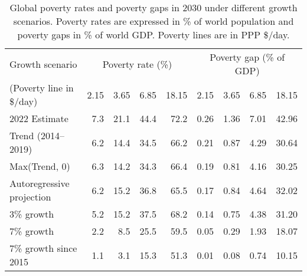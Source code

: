 \begin{table}[h]

\caption[Global poverty (rates and gaps) in 2030 under different growth scenarios.]{\label{tab:poverty}Global poverty rates and poverty gaps in 2030 under different growth scenarios. Poverty rates are expressed in \% of world population and poverty gaps in \% of world GDP. Poverty lines are in PPP \$/day.}
\centering
\begin{tabular}[t]{lrrrrrrrr}
\toprule Growth scenario & \multicolumn{4}{c}{Poverty rate (\%)} & \multicolumn{4}{c}{Poverty gap (\% of GDP)} \\ 
 (Poverty line in \$/day)  & 2.15 & 3.65 & 6.85 & 18.15 & 2.15 & 3.65 & 6.85 & 18.15\\
\midrule
2022 Estimate & 7.3 & 21.1 & 44.4 & 72.2 & 0.26 & 1.36 & 7.01 & 42.96\\
Trend (2014--2019) & 6.2 & 14.4 & 34.5 & 66.2 & 0.21 & 0.87 & 4.29 & 30.64\\
Max(Trend, 0) & 6.3 & 14.2 & 34.3 & 66.4 & 0.19 & 0.81 & 4.16 & 30.25\\
Autoregressive projection & 6.2 & 15.2 & 36.8 & 65.5 & 0.17 & 0.84 & 4.64 & 32.02\\
3\% growth & 5.2 & 15.2 & 37.5 & 68.2 & 0.14 & 0.75 & 4.38 & 31.20\\
7\% growth & 2.2 & 8.5 & 25.5 & 59.5 & 0.05 & 0.29 & 1.93 & 18.07\\
7\% growth since 2015 & 1.1 & 3.1 & 15.3 & 51.3 & 0.01 & 0.08 & 0.74 & 10.15\\
\bottomrule
\end{tabular}
\end{table}